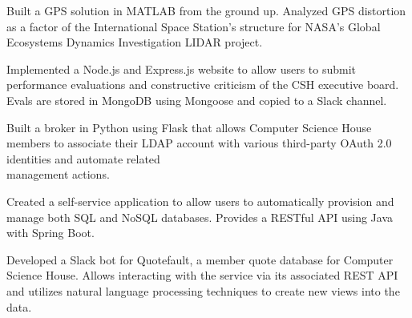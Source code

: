 \documentclass[9pt,letter]{altacv}
\begin{document}
\divider

Built a GPS solution in MATLAB from the ground up. Analyzed GPS distortion as a factor of the International Space Station's structure for NASA's Global Ecosystems Dynamics Investigation LIDAR project.


%
%



Implemented a Node.js and Express.js website to allow users to submit performance evaluations and constructive criticism of the CSH executive board. Evals are stored in MongoDB using Mongoose and copied to a Slack channel. 

Built a broker in Python using Flask that allows Computer Science House members to associate their LDAP account with various third-party OAuth 2.0 identities and automate related\\ management actions.

\divider

Created a self-service application to allow users to automatically provision and manage both SQL and NoSQL databases. Provides a RESTful API using Java with Spring Boot.

\divider

Developed a Slack bot for Quotefault, a member quote database for Computer Science House. Allows interacting with the service via its associated REST API and utilizes natural language processing techniques to create new views into the data.
\end{document}
